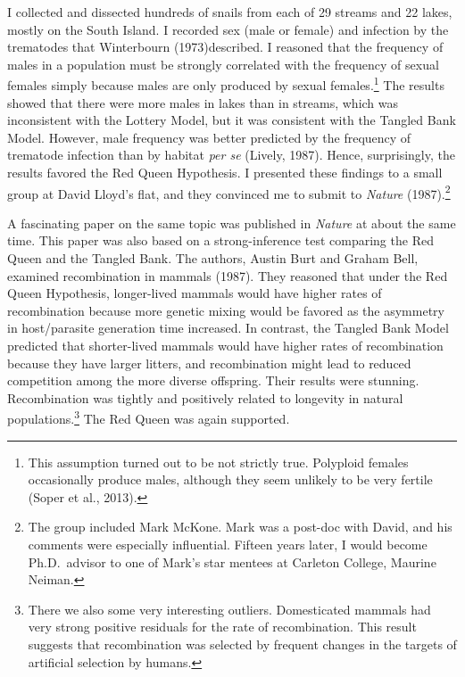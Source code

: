 \documentclass[
  letterpaper,
]{book}
\begin{document}
I collected and dissected hundreds of snails from each of 29 streams and
22 lakes, mostly on the South Island. I recorded sex (male or female)
and infection by the trematodes that Winterbourn (1973)described. I
reasoned that the frequency of males in a population must be strongly
correlated with the frequency of sexual females simply because males are
only produced by sexual females.\footnote{This assumption turned out to
  be not strictly true. Polyploid females occasionally produce males,
  although they seem unlikely to be very fertile (Soper et al., 2013).}
The results showed that there were more males in lakes than in streams,
which was inconsistent with the Lottery Model, but it was consistent
with the Tangled Bank Model. However, male frequency was better
predicted by the frequency of trematode infection than by habitat
\emph{per se} (Lively, 1987). Hence, surprisingly, the results favored
the Red Queen Hypothesis. I presented these findings to a small group at
David Lloyd's flat, and they convinced me to submit to \emph{Nature}
(1987).\footnote{The group included Mark McKone. Mark was a post-doc
  with David, and his comments were especially influential. Fifteen
  years later, I would become Ph.D.~advisor to one of Mark's star
  mentees at Carleton College, Maurine Neiman.}

A fascinating paper on the same topic was published in \emph{Nature} at
about the same time. This paper was also based on a strong-inference
test comparing the Red Queen and the Tangled Bank. The authors, Austin
Burt and Graham Bell, examined recombination in mammals (1987). They
reasoned that under the Red Queen Hypothesis, longer-lived mammals would
have higher rates of recombination because more genetic mixing would be
favored as the asymmetry in host/parasite generation time increased. In
contrast, the Tangled Bank Model predicted that shorter-lived mammals
would have higher rates of recombination because they have larger
litters, and recombination might lead to reduced competition among the
more diverse offspring. Their results were stunning. Recombination was
tightly and positively related to longevity in natural
populations.\footnote{There we also some very interesting outliers.
  Domesticated mammals had very strong positive residuals for the rate
  of recombination. This result suggests that recombination was selected
  by frequent changes in the targets of artificial selection by humans.}
The Red Queen was again supported.
\end{document}
